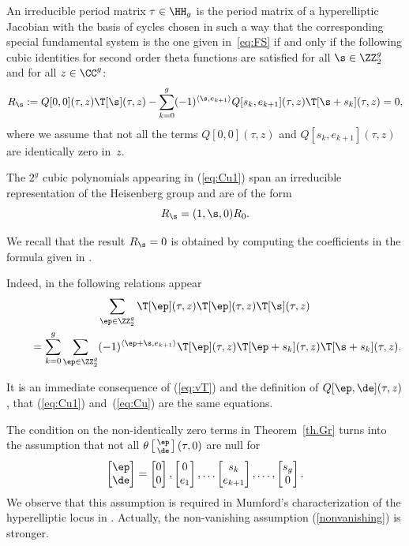 \begin{Theorem}\label{th.Gr} An irreducible period matrix $\tau\in \HH_g$ is the period matrix
of a hyperelliptic Jacobian with the basis of cycles chosen in such a way that the corresponding special fundamental system is the one given in~\eqref{eq:FS} if and only if the following cubic identities for second order theta functions are satisfied for all $\s\in \ZZ_2^g$ and for all $z\in \CC^g$:
 \begin{gather}\label{eq:Cu1}
 R_{\s}:= Q[0,0](\tau, z)\T[\s](\tau,z)- \sum_{k=0}^g (-1)^{\langle \s, e_{k+1}\rangle}
Q[s_k, e_{k+1}](\tau, z)\T[\s+s_k](\tau,z)=0,
\end{gather}
where we assume that not all the terms $ Q[0,0](\tau, z)$ and $Q[s_k, e_{k+1}](\tau, z)$ are identically zero in~$z$.
\end{Theorem}
\begin{Remark} The $2^g$ cubic polynomials appearing in (\ref{eq:Cu1}) span an irreducible representation of the Heisenberg group and are of the form
\[R_{\s}=(1,\s,0)R_0.
\]
\end{Remark}

We recall that the result $R_{\s}=0$ is obtained by computing the coefficients in the
formula given in \cite{BK2}.

Indeed, in \cite{Gr} the following relations appear
\begin{gather}
 \sum_{\ep\in\ZZ_2^g} \T[\ep](\tau,z)\T[\ep](\tau,z)\T[\s](\tau,z)\nonumber\\
\qquad {}= \sum_{k=0}^g \sum_{\ep\in\ZZ_2^g} (-1)^{\langle \ep+\s, e_{k+1}\rangle}\T[\ep](\tau,z)\T[\ep+ s_k](\tau,z)\T[\s+s_k](\tau,z). \label{eq:Cu}
\end{gather}

It is an immediate consequence of (\ref{eq:vT}) and the definition of $ Q[\ep,\de](\tau, z)$, that (\ref{eq:Cu1}) and~(\ref{eq:Cu}) are the same equations.

The condition on the non-identically zero terms in Theorem~\ref{th.Gr} turns into the assumption that not all $\theta\left[\begin{smallmatrix}\ep \\ \de\end{smallmatrix}\right](\tau,0) $ are null for
 \[
 \begin{bmatrix} \ep \\ \de\end{bmatrix} =\begin{bmatrix} 0 \\ 0 \end{bmatrix} ,\begin{bmatrix} 0 \\ e_{1}\end{bmatrix}, \dots\begin{bmatrix} s_k \\ e_{k+1} \end{bmatrix},\dots,\begin{bmatrix} s_g \\ 0
\end{bmatrix}.
\]
We observe that this assumption is required in Mumford's characterization of the hyperelliptic locus in \cite{mu}. Actually, the non-vanishing assumption (\ref{nonvanishing}) is stronger.

